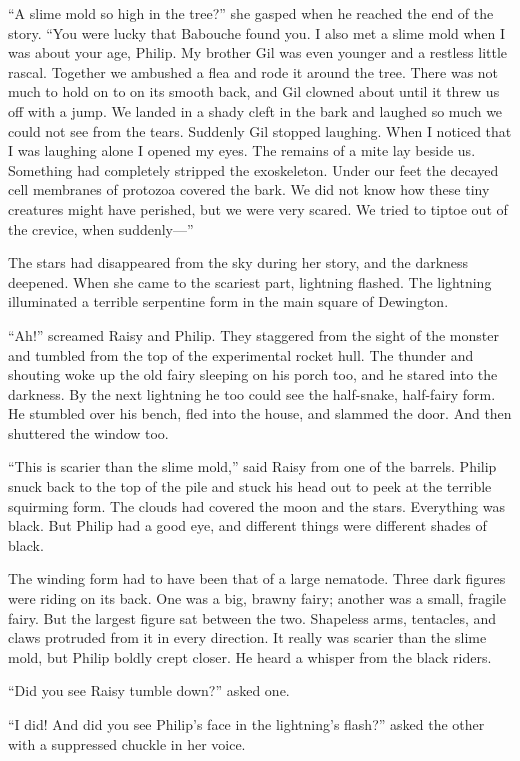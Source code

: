\documentclass[10pt]{memoir}
\begin{document}
``A slime mold so high in the tree?'' she gasped when he reached the end of the
story. ``You were lucky that Babouche found you. I also met a slime mold when I
was about your age, Philip. My brother Gil was even younger and a restless
little rascal. Together we ambushed a flea and rode it around the tree. There
was not much to hold on to on its smooth back, and Gil clowned about until it
threw us off with a jump. We landed in a shady cleft in the bark and laughed so
much we could not see from the tears. Suddenly Gil stopped laughing. When I
noticed that I was laughing alone I opened my eyes. The remains of a mite lay
beside us. Something had completely stripped the exoskeleton. Under our feet
the decayed cell membranes of protozoa covered the bark. We did not know how
these tiny creatures might have perished, but we were very scared. We tried to
tiptoe out of the crevice, when suddenly---''

The stars had disappeared from the sky during her story, and the darkness
deepened. When she came to the scariest part, lightning flashed. The lightning
illuminated a terrible serpentine form in the main square of Dewington.

``Ah!'' screamed Raisy and Philip. They staggered from the sight of the monster
and tumbled from the top of the experimental rocket hull. The thunder and
shouting woke up the old fairy sleeping on his porch too, and he stared into
the darkness. By the next lightning he too could see the half-snake, half-fairy
form. He stumbled over his bench, fled into the house, and slammed the door.
And then shuttered the window too.

``This is scarier than the slime mold,'' said Raisy from one of the barrels.
Philip snuck back to the top of the pile and stuck his head out to peek at the
terrible squirming form. The clouds had covered the moon and the stars.
Everything was black. But Philip had a good eye, and different things were
different shades of black.

The winding form had to have been that of a large nematode. Three dark figures
were riding on its back. One was a big, brawny fairy; another was a small,
fragile fairy. But the largest figure sat between the two. Shapeless arms,
tentacles, and claws protruded from it in every direction. It really was scarier
than the slime mold, but Philip boldly crept closer. He heard a whisper from
the black riders.

``Did you see Raisy tumble down?'' asked one.

``I did! And did you see Philip's face in the lightning's flash?'' asked the
other with a suppressed chuckle in her voice.
\end{document}
